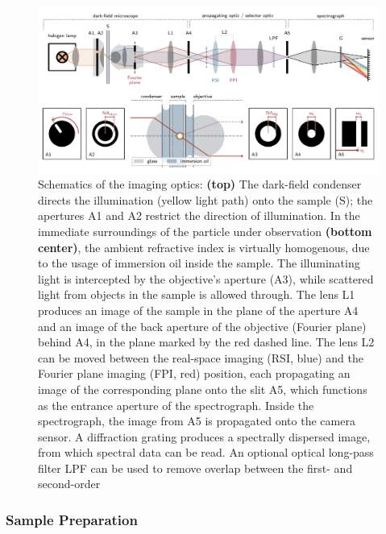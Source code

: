 \documentclass[10pt]{article}
\begin{document}
\begin{multicols}{2}
\begin{figure}[t]
    \centering
    \includegraphics[width=\textwidth]{[fig] setup}
    \caption{
    Schematics of the imaging optics: 
    {\sffamily\bfseries (top)} The dark-field condenser directs the illumination (yellow light path) onto the sample {\sffamily (S)}; the apertures {\sffamily A1} and {\sffamily A2} restrict the direction of illumination. 
    In the immediate surroundings of the particle under observation {\sffamily\bfseries (bottom center)}, the ambient refractive index is virtually homogenous, due to the usage of immersion oil inside the sample.  
    The illuminating light is intercepted by the objective's aperture {\sffamily (A3)}, while scattered light from objects in the sample is allowed through. 
    The lens {\sffamily L1} produces an image of the sample in the plane of the aperture {\sffamily A4} and an image of the back aperture of the objective (Fourier plane) behind {\sffamily A4}, in the plane marked by the red dashed line. 
    The lens {\sffamily L2} can be moved between the real-space imaging ({\sffamily RSI}, blue) and the Fourier plane imaging ({\sffamily FPI}, red) position, each propagating an image of the corresponding plane onto the slit {\sffamily A5}, which functions as the entrance aperture of the spectrograph. 
    Inside the spectrograph, the image from {\sffamily A5} is propagated onto the camera sensor. 
    A diffraction grating produces a spectrally dispersed image, from which spectral data can be read. 
    An optional optical long-pass filter {\sffamily LPF} can be used to remove overlap between the first- and second-order 
    }
    \label{fig:setup}
\end{figure}

\subsubsection*{Sample Preparation}


\end{multicols}
\end{document}
